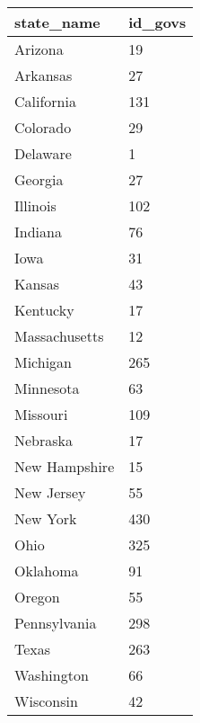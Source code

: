 \documentclass{article}
\begin{document}
\begin{table}[tbp] \centering
{}

\begin{tabularx}{\linewidth}{@{}lC@{}}

\toprule
{state\_name}&{id\_govs} \tabularnewline
\midrule \addlinespace[\belowrulesep]
Arizona&19 \tabularnewline
Arkansas&27 \tabularnewline
California&131 \tabularnewline
Colorado&29 \tabularnewline
Delaware&1 \tabularnewline
Georgia&27 \tabularnewline
Illinois&102 \tabularnewline
Indiana&76 \tabularnewline
Iowa&31 \tabularnewline
Kansas&43 \tabularnewline
Kentucky&17 \tabularnewline
Massachusetts&12 \tabularnewline
Michigan&265 \tabularnewline
Minnesota&63 \tabularnewline
Missouri&109 \tabularnewline
Nebraska&17 \tabularnewline
New Hampshire&15 \tabularnewline
New Jersey&55 \tabularnewline
New York&430 \tabularnewline
Ohio&325 \tabularnewline
Oklahoma&91 \tabularnewline
Oregon&55 \tabularnewline
Pennsylvania&298 \tabularnewline
Texas&263 \tabularnewline
Washington&66 \tabularnewline
Wisconsin&42 \tabularnewline
\bottomrule 

\end{tabularx}
\end{table}
\end{document}
